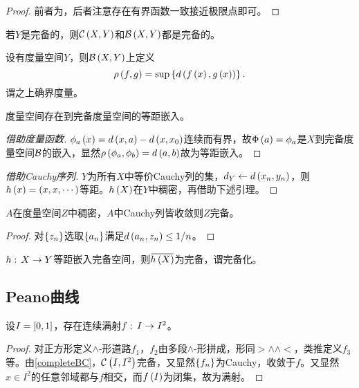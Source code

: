 \documentclass{ctexrep}
\begin{document}
  \begin{proof}
    前者为，后者注意存在有界函数一致接近极限点即可。
  \end{proof}
  \begin{corollary}
    \label{coll:completeBC}
    若$Y$是完备的，则$\mathcal{C}\left(X,Y\right)$和$\mathcal{B}\left(X,Y\right)$都是完备的。
  \end{corollary}
  \begin{definition}
    设有度量空间$Y$，则$\mathcal{B}\left(X,Y\right)$上定义
    \[ \rho\left(f,g\right) = \sup\left\{d\left(f\left(x\right),g\left(x\right)\right)\right\}. \]
    谓之上确界度量。
  \end{definition}
  \begin{theorem}
    度量空间存在到完备度量空间的等距嵌入。
  \end{theorem}
  \begin{proof}[借助度量函数]
    $\phi_a\left(x\right)=d\left(x,a\right)-d\left(x,x_0\right)$连续而有界，故$\Phi\left(a\right)=\phi_a$是$X$到完备度量空间$\mathcal{B}$的嵌入，显然$\rho\left(\phi_a,\phi_b\right)=d\left(a,b\right)$故为等距嵌入。
  \end{proof}
  \begin{proof}[借助Cauchy序列]
    $Y$为所有$X$中等价Cauchy列的集，$d_Y\leftarrow d\left(x_n,y_n\right)$，则$h\left(x\right)=\left(x,x,\cdots\right)$等距。$h\left(X\right)$在$Y$中稠密，再借助下述引理。
  \end{proof}
  \begin{lemma}
    $A$在度量空间$Z$中稠密，$A$中Cauchy列皆收敛则$Z$完备。
  \end{lemma}
  \begin{proof}
    对$\left\{z_n\right\}$选取$\left\{a_n\right\}$满足$d\left(a_n,z_n\right)\le 1/n$。
  \end{proof}
  \begin{definition}
    $h:\, X \rightarrow Y$等距嵌入完备空间，则$\clo{h\pare{X}}$为完备，谓完备化。
  \end{definition}
  \subsection{Peano曲线}
  \begin{theorem}
    设$I=\left[0,1\right]$，存在连续满射$f:\, I \rightarrow I^2$。
  \end{theorem}
  \begin{proof}
    对正方形定义$\land$-形道路$f_1$，$f_2$由多段$\land$-形拼成，形同$>\land\land <$，类推定义$f_3$等。由\cref{completeBC}，$\mathcal{C}\left(I,I^2\right)$完备，又显然$\left\{f_n\right\}$为Cauchy，收敛于$f$。又显然$x\in I^2$的任意邻域都与$f$相交，而$f\left(I\right)$为闭集，故为满射。
  \end{proof}
  
\end{document}
